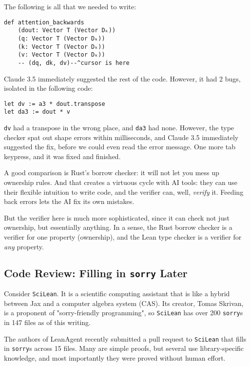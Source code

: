 \documentclass{article}
\begin{document}
The following is all that we needed to write:

\begin{verbatim}
def attention_backwards
    (dout: Vector T (Vector Dₖ))
    (q: Vector T (Vector Dₖ))
    (k: Vector T (Vector Dₖ))
    (v: Vector T (Vector Dₖ))
    -- (dq, dk, dv)--^cursor is here
\end{verbatim}

Claude 3.5 immediately suggested the rest of the code. However, it had 2 bugs, isolated in the following code:

\begin{verbatim}
let dv := a3 * dout.transpose
let da3 := dout * v
\end{verbatim}

\texttt{dv} had a transpose in the wrong place, and \texttt{da3} had none. However, the type checker spat out shape errors within milliseconds, and Claude 3.5 immediately suggested the fix, before we could even read the error message. One more tab keypress, and it was fixed and finished.

A good comparison is Rust's borrow checker: it will not let you mess up ownership rules. And that creates a virtuous cycle with AI tools: they can use their flexible intuition to write code, and the verifier can, well, \textit{verify} it. Feeding back errors lets the AI fix its own mistakes.

But the verifier here is much more sophisticated, since it can check not just ownership, but essentially anything. In a sense, the Rust borrow checker is a verifier for one property (ownership), and the Lean type checker is a verifier for \textit{any} property.

\subsection{Code Review: Filling in \texttt{sorry} Later}

Consider \texttt{SciLean}. It is a scientific computing assistant that is like a hybrid between Jax and a computer algebra system (CAS). Its creator, Tomas Skrivan, is a proponent of "sorry-friendly programming", so \texttt{SciLean} has over 200 \texttt{sorry}s in 147 files as of this writing.

The authors of LeanAgent recently submitted a pull request to \texttt{SciLean} that fills in \texttt{sorry}s across 15 files. Many are simple proofs, but several use library-specific knowledge, and most importantly they were proved without human effort.
\end{document}
